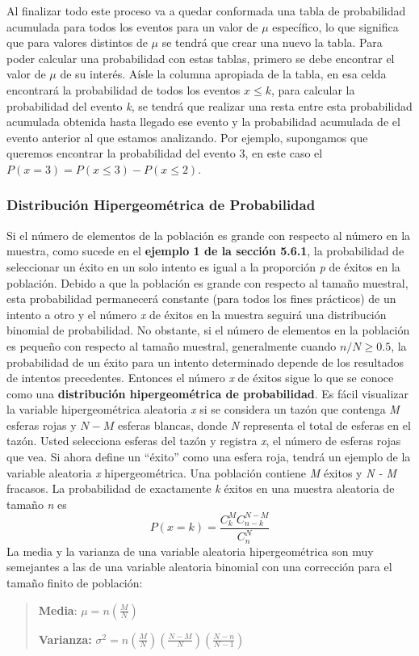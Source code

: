 \documentclass[]{article}
\begin{document}
 Al finalizar todo este proceso va a quedar conformada una tabla de probabilidad acumulada para todos los eventos para un valor de $\mu$ específico, lo que significa que para valores distintos de $\mu$ se tendrá que crear una nuevo la tabla.
 Para poder calcular una probabilidad con estas tablas, primero se debe encontrar el valor de $\mu$ de su interés. Aísle la columna apropiada de la tabla, en esa celda encontrará la probabilidad de todos los eventos $x \leq k$, para calcular la probabilidad del evento \textit{k}, se tendrá que realizar una resta entre esta probabilidad acumulada obtenida hasta llegado ese evento y la probabilidad acumulada de el evento anterior al que estamos analizando. Por ejemplo, supongamos que queremos encontrar la probabilidad del evento 3, en este caso el $P(x = 3) = P(x \leq 3) - P(x \leq 2)$.
 \subsubsection{Distribución Hipergeométrica de Probabilidad}
 Si el número de elementos de la población es grande con respecto al número en la muestra, como sucede en el \textbf{ejemplo 1 de la sección 5.6.1}, la probabilidad de seleccionar un éxito en un solo intento es igual a la proporción \textit{p} de éxitos en la población. Debido a que la población es grande con respecto al tamaño muestral, esta probabilidad permanecerá constante (para todos los fines prácticos) de un intento a otro y el número \textit{x} de éxitos en la muestra seguirá una distribución binomial de probabilidad. No obstante, si el número de elementos en la población es pequeño con respecto al tamaño muestral, generalmente cuando $n/N \geq 0.5$, la probabilidad de un éxito para un intento determinado depende de los resultados de intentos precedentes. Entonces el número \textit{x} de éxitos sigue lo que se conoce como una \textbf{distribución hipergeométrica de probabilidad}. \newline
 Es fácil visualizar la variable hipergeométrica aleatoria \textit{x} si se considera un tazón que contenga \textit{M} esferas rojas y $N - M$ esferas blancas, donde \textit{N}  representa el total de esferas en el tazón. Usted selecciona  esferas del tazón y registra \textit{x}, el número de esferas rojas que vea. Si ahora define un “éxito” como una esfera roja, tendrá un ejemplo de la variable aleatoria \textit{x} hipergeométrica.\newline
 Una población contiene \textit{M} éxitos y \textit{N - M} fracasos. La probabilidad de exactamente \textit{k} éxitos en una muestra aleatoria de tamaño \textit{n} es
 \[ P(x = k) = \frac{C^M_kC^{N-M}_{n-k}}{C^N_n} \]
 La media y la varianza de una variable aleatoria hipergeométrica son muy semejantes a las de una variable aleatoria binomial con una corrección para el tamaño finito de población:
 \begin{quote}
 	\item \textbf{Media}: $\mu = n(\frac{M}{N})$
 	\item \textbf{Varianza:} $\sigma^2 = n(\frac{M}{N})(\frac{N-M}{N})(\frac{N-n}{N-1})$
 \end{quote}
\end{document}

